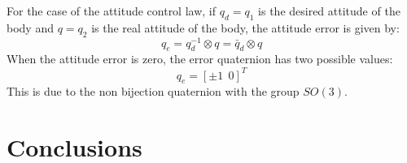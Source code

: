  For the case of the attitude control law, if $q_d=q_1$ is the desired attitude of the body and $q=q_2$ is the real attitude of the body, the attitude error is given by:
 \begin{equation}\label{qerr}
   q_e=q_d^{-1}\otimes q=\bar{q}_d\otimes q
 \end{equation}
 When the attitude error is zero, the error quaternion has two possible values:
 \begin{equation}\label{qe1}
   q_e=[\pm1 \ \ 0]^T
 \end{equation}
 This is due to the non bijection quaternion with the group $SO(3)$.


 \section{Conclusions}
